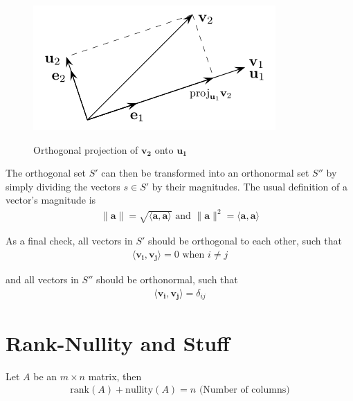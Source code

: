 \documentclass[a4paper,10pt]{report}
\newcommand{\norm}[1]{\lVert#1\rVert} 		%
\newcommand{\ip}[2]{\langle#1,#2\rangle}	%
\newcommand{\vb}[1]{\mathbf{#1}}		%
\begin{document}
      \begin{figure}[htpb]
      \begin{centering}
      \begin{center}
      \includegraphics[width=\linewidth]{./projection.png}
      \label{fig:projection}
      \caption{Orthogonal projection of $\vb{v_2}$ onto $\vb{u_1}$}
      \end{center}
      \par\end{centering}
      \end{figure}

    The orthogonal set $S'$ can then be transformed into an orthonormal set $S''$ by simply dividing the vectors $s\in S'$ by their magnitudes. The usual definition of a vector's magnitude is
    \begin{align*}
    \norm{\vb{a}} = \sqrt{\ip{\vb{a}}{\vb{a}}} \text{ and } \norm{\vb{a}}^2 = \ip{\vb{a}}{\vb{a}}
    \end{align*}

    As a final check, all vectors in $S'$ should be orthogonal to each other, such that
    \begin{align*}
    \ip{\vb{v_i}}{\vb{v_j}} = 0 \text{ when } i \neq j
    \end{align*}

    and all vectors in $S''$ should be orthonormal, such that
    \begin{align*}
    \ip{\vb{v_i}}{\vb{v_j}} = \delta_{ij}
    \end{align*}

\section{Rank-Nullity and Stuff}
  Let $A$ be an $m\times n$ matrix, then
  \begin{align*}
    \text{rank}(A) + \text{nullity}(A) = n \text{ (Number of columns)}
  \end{align*}
\end{document}
